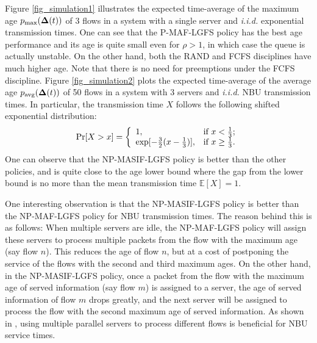 Figure \ref{fig_simulation1} illustrates the expected time-average of the maximum age $p_{\max} (\bm{\Delta}(t))$ of 3 flows in a system with a single server and \emph{i.i.d.} exponential transmission times. One can see that the P-MAF-LGFS policy has the best age performance and its age is quite small even for $\rho>1$, in which case  the queue is actually unstable. On the other hand,  both the RAND and FCFS disciplines have much higher age. Note that there is no need for preemptions under the FCFS discipline.  Figure \ref{fig_simulation2} plots the expected time-average of the average age $p_{\text{avg}} (\bm{\Delta}(t))$ of 50 flows in a system with 3 servers and \emph{i.i.d.} NBU transmission times. In particular, the  transmission time $X$ follows the following shifted exponential distribution:
\begin{align}
\Pr[X>x] = \left\{\begin{array}{l l}1,&\text{if}~x<\frac{1}{3};\\
\exp[-\frac{3}{2}(x-\frac{1}{3})],&\text{if}~x\geq \frac{1}{3}.
\end{array}\right.
\end{align}
One can observe that the NP-MASIF-LGFS policy is better than the other policies, and is quite close to the age lower bound where the gap from the lower bound is no more than the mean transmission time $\mathbb{E}[X]=1$. {\blue One interesting observation is that the NP-MASIF-LGFS policy is better than the NP-MAF-LGFS policy for NBU transmission times. The reason behind this  is as follows: When multiple servers are idle,  the NP-MAF-LGFS policy will assign these servers to process multiple packets from the flow with the maximum age (say flow $n$). This reduces the age of flow $n$, but at a cost of postponing the service of the flows with the second and third maximum ages. On the other hand, in the NP-MASIF-LGFS policy, once a packet from the flow with the maximum age of served information  (say flow $m$) is assigned to a server, the age of served information of flow $m$ drops greatly, and the next server will be assigned to process the flow with the second maximum age of served information. 
As shown in \cite{sun2016delay,sun2017delay}, using multiple parallel servers to process different flows is beneficial for NBU service times. 

 }





